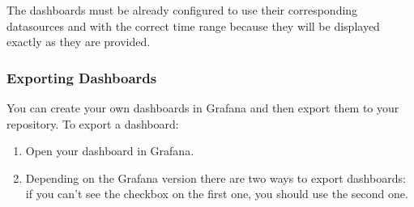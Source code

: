 \documentclass[letterpaper,10pt,english]{sphinxmanual}
\begin{document}
The dashboards must be already configured to use their corresponding
datasources and with the correct time range because they will be displayed
exactly as they are provided.


\subsubsection{Exporting Dashboards}
\label{\detokenize{inputStructure:exporting-dashboards}}
You can create your own dashboards in Grafana and then export them to your
repository. To export a dashboard:
\begin{enumerate}
\def\theenumi{\arabic{enumi}}
\def\labelenumi{\theenumi .}
\makeatletter\def\p@enumii{\p@enumi \theenumi .}\makeatother
\item {} 
Open your dashboard in Grafana.

\item {} 
Depending on the Grafana version there are two ways to export dashboards: if
you can’t see the checkbox on the first one, you should use the second one.

\end{enumerate}
\end{document}
